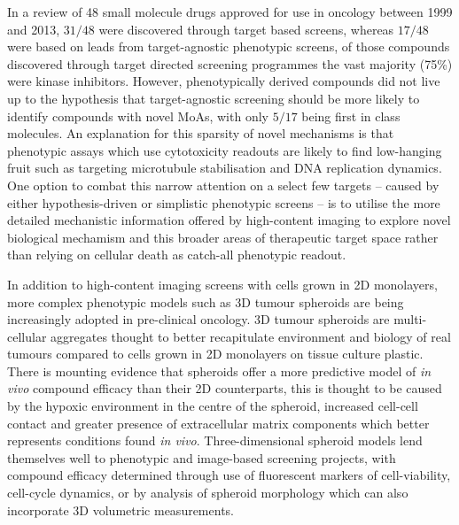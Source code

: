 \documentclass[a4paper,11pt,twoside,openright]{scrbook}
\begin{document}
In a review of 48 small molecule drugs approved for use in oncology between 1999 and 2013, $31/48$ were discovered through target based screens, whereas $17/48$ were based on leads from target-agnostic phenotypic screens, \cite{Moffat2014} of those compounds discovered through target directed screening programmes the vast majority (75\%) were kinase inhibitors.
However, phenotypically derived compounds did not live up to the hypothesis that target-agnostic screening should be more likely to identify compounds with novel MoAs, \cite{Swinney2011} with only $5/17$ being first in class molecules.
An explanation for this sparsity of novel mechanisms is that phenotypic assays which use cytotoxicity readouts are likely to find low-hanging fruit such as targeting microtubule stabilisation and DNA replication dynamics. \cite{Moffat2014}
One option to combat this narrow attention on a select few targets -- caused by either hypothesis-driven or simplistic phenotypic screens -- is to utilise the more detailed mechanistic information offered by high-content imaging to explore novel biological mechamism and this broader areas of therapeutic target space rather than relying on cellular death as catch-all phenotypic readout.

In addition to high-content imaging screens with cells grown in 2D monolayers, more complex phenotypic models such as 3D tumour spheroids are being increasingly adopted in pre-clinical oncology.
3D tumour spheroids are multi-cellular aggregates thought to better recapitulate environment and biology of real tumours compared to cells grown in 2D monolayers on tissue culture plastic.
There is mounting evidence that spheroids offer a more predictive model of \textit{in vivo} compound efficacy than their 2D counterparts, \cite{Pickl2009, Breslin2013,Lovitt2013} this is thought to be caused by the hypoxic environment in the centre of the spheroid, increased cell-cell contact and greater presence of extracellular matrix components which better represents conditions found \textit{in vivo}.
Three-dimensional spheroid models lend themselves well to phenotypic and image-based screening projects, with compound efficacy determined through use of fluorescent markers of cell-viability, \cite{Lovitt2013} cell-cycle dynamics, \cite{Laurent2013} or by analysis of spheroid morphology which can also incorporate 3D volumetric measurements. \cite{Huang2017}
\end{document}
